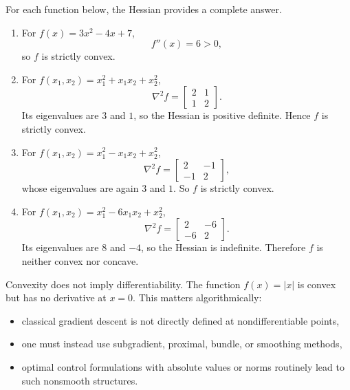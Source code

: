 \begin{eg}
	For each function below, the Hessian provides a complete answer.
	\begin{enumerate}[label=(\alph*)]
		\item For $f(x)=3x^2-4x+7$,
		      \[
			      f''(x)=6>0,
		      \]
		      so $f$ is strictly convex.

		\item For $f(x_1,x_2)=x_1^2+x_1x_2+x_2^2$,
		      \[
			      \nabla^2 f = \begin{bmatrix}
				      2 & 1 \\
				      1 & 2
			      \end{bmatrix}.
		      \]
		      Its eigenvalues are $3$ and $1$, so the Hessian is positive definite. Hence $f$ is strictly convex.

		\item For $f(x_1,x_2)=x_1^2-x_1x_2+x_2^2$,
		      \[
			      \nabla^2 f = \begin{bmatrix}
				      2  & -1 \\
				      -1 & 2
			      \end{bmatrix},
		      \]
		      whose eigenvalues are again $3$ and $1$. So $f$ is strictly convex.

		\item For $f(x_1,x_2)=x_1^2-6x_1x_2+x_2^2$,
		      \[
			      \nabla^2 f = \begin{bmatrix}
				      2  & -6 \\
				      -6 & 2
			      \end{bmatrix}.
		      \]
		      Its eigenvalues are $8$ and $-4$, so the Hessian is indefinite. Therefore $f$ is neither convex nor concave.
	\end{enumerate}
\end{eg}

\begin{remark}
	Convexity does not imply differentiability. The function $f(x)=|x|$ is convex but has no derivative at $x=0$. This matters algorithmically:
	\begin{itemize}
		\item classical gradient descent is not directly defined at nondifferentiable points,
		\item one must instead use subgradient, proximal, bundle, or smoothing methods,
		\item optimal control formulations with absolute values or norms routinely lead to such nonsmooth structures.
	\end{itemize}
\end{remark}

